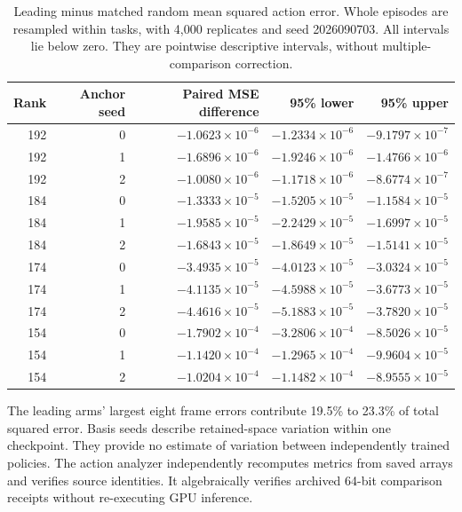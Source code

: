 \documentclass{article}
\begin{document}
\begin{table}[ht]
\centering\small\setlength{\tabcolsep}{8pt}
\begin{tabular}{@{}rrrrr@{}}
\toprule
Rank & Anchor seed & Paired MSE difference & 95\% lower & 95\% upper\\
\midrule
192 & 0 & $-1.0623\times10^{-6}$ & $-1.2334\times10^{-6}$ & $-9.1797\times10^{-7}$\\
192 & 1 & $-1.6896\times10^{-6}$ & $-1.9246\times10^{-6}$ & $-1.4766\times10^{-6}$\\
192 & 2 & $-1.0080\times10^{-6}$ & $-1.1718\times10^{-6}$ & $-8.6774\times10^{-7}$\\
184 & 0 & $-1.3333\times10^{-5}$ & $-1.5205\times10^{-5}$ & $-1.1584\times10^{-5}$\\
184 & 1 & $-1.9585\times10^{-5}$ & $-2.2429\times10^{-5}$ & $-1.6997\times10^{-5}$\\
184 & 2 & $-1.6843\times10^{-5}$ & $-1.8649\times10^{-5}$ & $-1.5141\times10^{-5}$\\
174 & 0 & $-3.4935\times10^{-5}$ & $-4.0123\times10^{-5}$ & $-3.0324\times10^{-5}$\\
174 & 1 & $-4.1135\times10^{-5}$ & $-4.5988\times10^{-5}$ & $-3.6773\times10^{-5}$\\
174 & 2 & $-4.4616\times10^{-5}$ & $-5.1883\times10^{-5}$ & $-3.7820\times10^{-5}$\\
154 & 0 & $-1.7902\times10^{-4}$ & $-3.2806\times10^{-4}$ & $-8.5026\times10^{-5}$\\
154 & 1 & $-1.1420\times10^{-4}$ & $-1.2965\times10^{-4}$ & $-9.9604\times10^{-5}$\\
154 & 2 & $-1.0204\times10^{-4}$ & $-1.1482\times10^{-4}$ & $-8.9555\times10^{-5}$\\
\bottomrule
\end{tabular}
\caption{Leading minus matched random mean squared action error. Whole episodes are resampled within tasks, with 4,000 replicates and seed 2026090703. All intervals lie below zero. They are pointwise descriptive intervals, without multiple-comparison correction.}
\label{tab.actionintervals}
\end{table}

The leading arms' largest eight frame errors contribute 19.5\% to 23.3\% of total squared error. Basis seeds describe retained-space variation within one checkpoint. They provide no estimate of variation between independently trained policies. The action analyzer independently recomputes metrics from saved arrays and verifies source identities. It algebraically verifies archived 64-bit comparison receipts without re-executing GPU inference.
\end{document}

